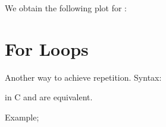 \documentclass[a4paper,10pt,english]{jupyterBook}
\begin{document}
\sphinxAtStartPar
We obtain the following plot for :

\sphinxAtStartPar
{}

\sphinxstepscope


\section{For Loops}
\label{\detokenize{text/progtut/for:for-loops}}\label{\detokenize{text/progtut/for:my-label}}\label{\detokenize{text/progtut/for::doc}}
\sphinxAtStartPar
Another way to achieve repetition.
Syntax:

\begin{sphinxVerbatim}[commandchars=\\\{\}]
\end{sphinxVerbatim}

\sphinxAtStartPar
in C  and  are equivalent.

\sphinxAtStartPar
Example;
\end{document}
